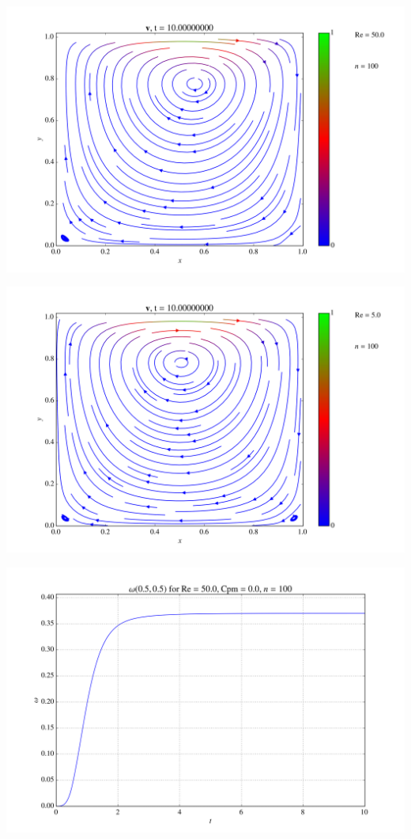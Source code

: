 \documentclass[portrait,a0paper,fontscale=0.40]{baposter} %
\begin{document}
\begin{poster}
{\begin{multicols}{2}
\begin{center}
\includegraphics[width=0.67\linewidth]{simulations/vRe50N100Chi01Cpm0T10fps20.png}
\end{center}

\begin{center}
\includegraphics[width=0.67\linewidth]{simulations/Re5NoMagnetism.png}
\end{center}

\begin{center}
\includegraphics[width=0.67\linewidth]{simulations/vortRe50N100Chi01Cpm0T10fps20.png}
\end{center}


\end{multicols}}
\end{poster}
\end{document}
